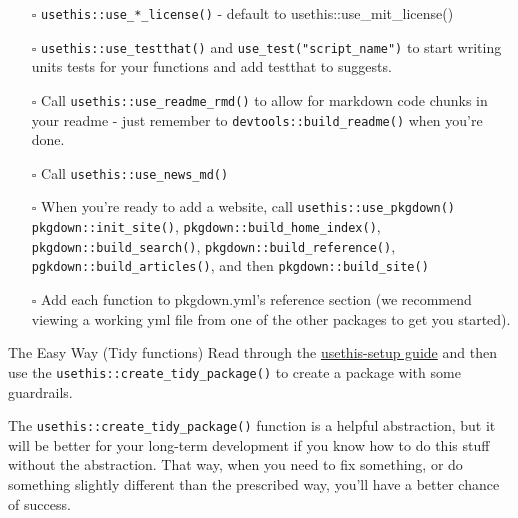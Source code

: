 \documentclass[
  letterpaper,
  DIV=11,
  numbers=noendperiod]{scrreprt}
\providecommand{\tightlist}{%
  \setlength{\itemsep}{0pt}\setlength{\parskip}{0pt}}\usepackage{longtable,booktabs,array}
\begin{document}
\begin{itemize}
\tightlist
\item[$\square$]
  \texttt{usethis::use\_*\_license()} - default to
  usethis::use\_mit\_license()
\item[$\square$]
  \texttt{usethis::use\_testthat()} and
  \texttt{use\_test("script\_name")} to start writing units tests for
  your functions and add testthat to suggests.
\item[$\square$]
  Call \texttt{usethis::use\_readme\_rmd()} to allow for markdown code
  chunks in your readme - just remember to
  \texttt{devtools::build\_readme()} when you're done.
\item[$\square$]
  Call \texttt{usethis::use\_news\_md()}
\item[$\square$]
  When you're ready to add a website, call
  \texttt{usethis::use\_pkgdown()} \texttt{pkgdown::init\_site()},
  \texttt{pkgdown::build\_home\_index()},
  \texttt{pkgdown::build\_search()},
  \texttt{pkgdown::build\_reference()},
  \texttt{pgkdown::build\_articles()}, and then
  \texttt{pkgdown::build\_site()}
\item[$\square$]
  Add each function to pkgdown.yml's reference section (we recommend
  viewing a working yml file from one of the other packages to get you
  started).
\end{itemize}

The Easy Way (Tidy functions) Read through the
\href{https://usethis.r-lib.org/articles/usethis-setup.html}{usethis-setup
guide} and then use the \texttt{usethis::create\_tidy\_package()} to
create a package with some guardrails.

\begin{tcolorbox}[enhanced jigsaw, opacitybacktitle=0.6, breakable, title=\textcolor{quarto-callout-tip-color}{\faLightbulb}\hspace{0.5em}{Guardrails or no guardrails?}, arc=.35mm, colframe=quarto-callout-tip-color-frame, colbacktitle=quarto-callout-tip-color!10!white, left=2mm, bottomrule=.15mm, opacityback=0, toprule=.15mm, bottomtitle=1mm, toptitle=1mm, titlerule=0mm, leftrule=.75mm, colback=white, rightrule=.15mm, coltitle=black]

The \texttt{usethis::create\_tidy\_package()} function is a helpful
abstraction, but it will be better for your long-term development if you
know how to do this stuff without the abstraction. That way, when you
need to fix something, or do something slightly different than the
prescribed way, you'll have a better chance of success.

\end{tcolorbox}
\end{document}
